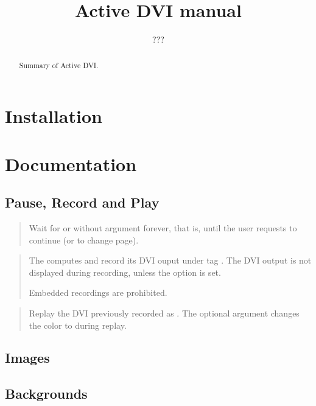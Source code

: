 \documentclass{article}
\title {Active DVI manual}
\author {???}
\begin{document}
\maketitle

\begin{abstract}
Summary of Active DVI.
\end{abstract}

\tableofcontents

\section {Installation}


\section {Documentation}

\subsection {Pause, Record and Play}

\medskip\noindent
\docdef \adviwait{}
\begin{quote}
Wait for  or without argument forever, that is, until the
user requests to continue (or to change page).
\end{quote}

\medskip\noindent
\docdef \advirecord \doctt{[play]}
\begin{quote}
The computes  and record its DVI ouput under tag
. The DVI output is not displayed during recording, unless the
option  is set.

Embedded recordings are prohibited. 
\end{quote}

\medskip\noindent
\docdef \adviplay{}
\begin{quote}
Replay the DVI previously recorded as .
The optional argument changes the color to  during replay. 
\end{quote}

\subsection {Images}

\subsection {Backgrounds}
\end{document}
